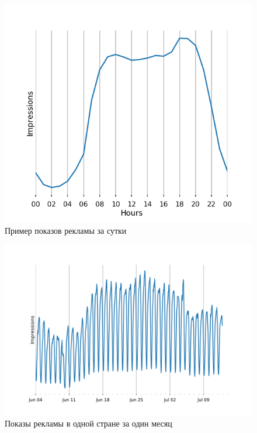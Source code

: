 \documentclass[%
12pt,
master,  %
natbib,      %
subf,        %
substylefile = spbu.rtx,
href,        %
colorlinks,  %
]{disser}
\begin{document}
\begin{figure}[!hhh]
	\begin{center}
		\includegraphics[width=12cm]{examples_day}
	\end{center}
	\vspace{-5mm}\caption{Пример показов рекламы за сутки}
	\label{fig:examples_day}
\end{figure}
 
\begin{figure}[!hhh]
	\begin{center}
		\includegraphics[width=12cm]{examples_month}
	\end{center}
	\vspace{-5mm}\caption{Показы рекламы в одной стране за один месяц}
	\label{fig:examples_month}
\end{figure}
\end{document}
